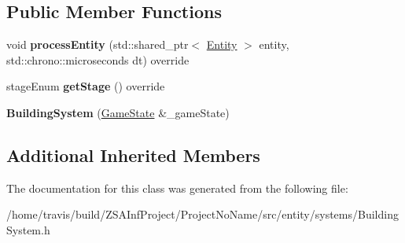 \subsection*{Public Member Functions}
\begin{DoxyCompactItemize}
\item 
\hypertarget{classBuildingSystem_a9134d5edf294381c5eee516684148ee5}{void {\bfseries process\-Entity} (std\-::shared\-\_\-ptr$<$ \hyperlink{classEntity}{Entity} $>$ entity, std\-::chrono\-::microseconds dt) override}\label{classBuildingSystem_a9134d5edf294381c5eee516684148ee5}

\item 
\hypertarget{classBuildingSystem_a42b6c82020b3b694201b9b02d07ee9ef}{stage\-Enum {\bfseries get\-Stage} () override}\label{classBuildingSystem_a42b6c82020b3b694201b9b02d07ee9ef}

\item 
\hypertarget{classBuildingSystem_a62199250b00dd8b81ade740096611f13}{{\bfseries Building\-System} (\hyperlink{classGameState}{Game\-State} \&\-\_\-game\-State)}\label{classBuildingSystem_a62199250b00dd8b81ade740096611f13}

\end{DoxyCompactItemize}
\subsection*{Additional Inherited Members}


The documentation for this class was generated from the following file\-:\begin{DoxyCompactItemize}
\item 
/home/travis/build/\-Z\-S\-A\-Inf\-Project/\-Project\-No\-Name/src/entity/systems/Building\-System.\-h\end{DoxyCompactItemize}
